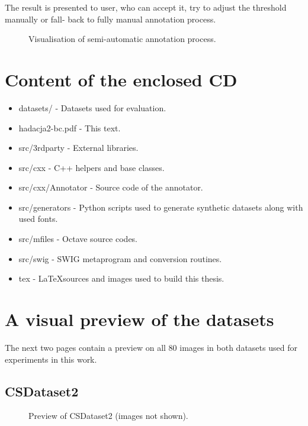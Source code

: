 \documentclass[12pt,a4paper]{report}
\begin{document}
The result is presented to user, who can accept it, try to adjust the threshold manually or fall- back to fully manual annotation process.

\begin{figure}[htbp]
    \centering
    \caption{Visualisation of semi-automatic annotation process.}
    \label{fig:annotator}
\end{figure}

\chapter{Content of the enclosed CD}
\begin{itemize}
    \item datasets/ - Datasets used for evaluation.
    \item hadacja2-bc.pdf - This text.
    \item src/3rdparty - External libraries.
    \item src/cxx - C++ helpers and base classes.
    \item src/cxx/Annotator - Source code of the annotator.
    \item src/generators - Python scripts used to generate synthetic datasets along with used fonts.
    \item src/mfiles - Octave source codes.
    \item src/swig - SWIG metaprogram and conversion routines.
    \item tex - \LaTeX sources and images used to build this thesis.
\end{itemize}

\chapter{A visual preview of the datasets}
The next two pages contain a preview on all 80 images in both datasets used for experiments in this work.

\section{CSDataset2}
\begin{figure}[htbp]
    \centering
    \caption{Preview of CSDataset2 (images not shown).}
    \label{fig:dataset2-preview}
\end{figure}
\end{document}
